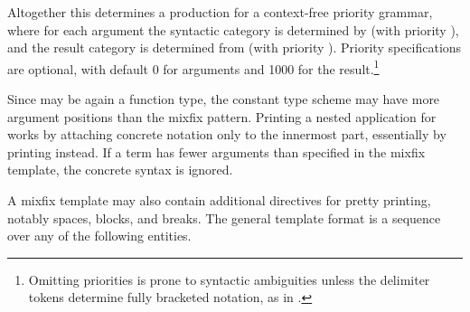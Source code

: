 \begin{isabellebody}
\begin{isamarkuptext}
  Altogether this determines a production for a context-free priority
  grammar, where for each argument  the syntactic category
  is determined by  (with priority ), and the
  result category is determined from  (with priority ).  Priority specifications are optional, with default 0 for
  arguments and 1000 for the result.\footnote{Omitting priorities is
  prone to syntactic ambiguities unless the delimiter tokens determine
  fully bracketed notation, as in .}

  Since  may be again a function type, the constant
  type scheme may have more argument positions than the mixfix
  pattern.  Printing a nested application  for
   works by attaching concrete notation only to the
  innermost part, essentially by printing 
  instead.  If a term has fewer arguments than specified in the mixfix
  template, the concrete syntax is ignored.

  \medskip A mixfix template may also contain additional directives
  for pretty printing, notably spaces, blocks, and breaks.  The
  general template format is a sequence over any of the following
  entities.


\end{isamarkuptext}
\end{isabellebody}
